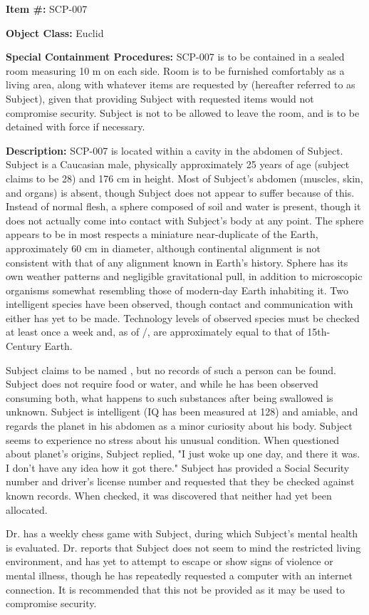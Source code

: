 \textbf{Item \#:} SCP-007

\textbf{Object Class:} Euclid

\textbf{Special Containment Procedures:} SCP-007 is to be contained in a sealed room measuring 10 m on each side. Room is to be furnished comfortably as a living area, along with whatever items are requested by  (hereafter referred to as Subject), given that providing Subject with requested items would not compromise security. Subject is not to be allowed to leave the room, and is to be detained with force if necessary.

\textbf{Description:} SCP-007 is located within a cavity in the abdomen of Subject. Subject is a Caucasian male, physically approximately 25 years of age (subject claims to be 28) and 176 cm in height. Most of Subject's abdomen (muscles, skin, and organs) is absent, though Subject does not appear to suffer because of this. Instead of normal flesh, a sphere composed of soil and water is present, though it does not actually come into contact with Subject's body at any point. The sphere appears to be in most respects a miniature near-duplicate of the Earth, approximately 60 cm in diameter, although continental alignment is not consistent with that of any alignment known in Earth's history. Sphere has its own weather patterns and negligible gravitational pull, in addition to microscopic organisms somewhat resembling those of modern-day Earth inhabiting it. Two intelligent species have been observed, though contact and communication with either has yet to be made. Technology levels of observed species must be checked at least once a week and, as of /, are approximately equal to that of 15th-Century Earth.

Subject claims to be named , but no records of such a person can be found. Subject does not require food or water, and while he has been observed consuming both, what happens to such substances after being swallowed is unknown. Subject is intelligent (IQ has been measured at 128) and amiable, and regards the planet in his abdomen as a minor curiosity about his body. Subject seems to experience no stress about his unusual condition. When questioned about planet's origins, Subject replied, "I just woke up one day, and there it was. I don't have any idea how it got there." Subject has provided a Social Security number and driver's license number and requested that they be checked against known records. When checked, it was discovered that neither had yet been allocated.

Dr.  has a weekly chess game with Subject, during which Subject's mental health is evaluated. Dr.  reports that Subject does not seem to mind the restricted living environment, and has yet to attempt to escape or show signs of violence or mental illness, though he has repeatedly requested a computer with an internet connection. It is recommended that this not be provided as it may be used to compromise security.